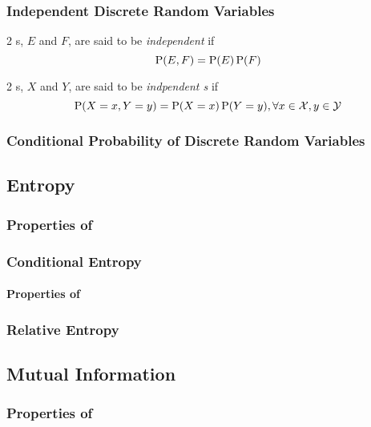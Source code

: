 \subsubsection{Independent Discrete Random Variables}\label{subsubsec:Independent_Discrete_Random_Variables}
\begin{definition}[Independent]\label{def:Independent}
  2 s, $E$ and $F$, are said to be \emph{independent} if
  \begin{equation}\label{eq:Independent}
    \operatorname{\operatorname{P}}(E,F) = \operatorname{\operatorname{P}}(E) \operatorname{\operatorname{P}}(F)
  \end{equation}

  2 s, $X$ and $Y$, are said to be \emph{indpendent s} if
  \begin{equation}\label{eq:Independent_Random_Variables}
    \operatorname{\operatorname{P}}(X=x, Y=y) = \operatorname{\operatorname{P}}(X=x) \operatorname{\operatorname{P}}(Y=y), \forall x \in \mathcal{X}, y \in \mathcal{Y}
  \end{equation}
\end{definition}

\subsubsection{Conditional Probability of  Discrete Random Variables}\label{subsubsec:Conditional_Probability_Discrete_Random_Variables}

\subsection{Entropy}\label{subsec:Entropy}
\subsubsection{Properties of }\label{subsubsec:Entropy_Properties}

\subsubsection{Conditional Entropy}\label{subsubsec:Conditional_Entropy}
\paragraph{Properties of }\label{par:Conditional_Entropy_Properties}

\subsubsection{Relative Entropy}\label{subsubsec:Relative_Entropy}

\subsection{Mutual Information}\label{subsec:Mutual_Information}
\subsubsection{Properties of }\label{subsubsec:Mutual_Information_Properties}
